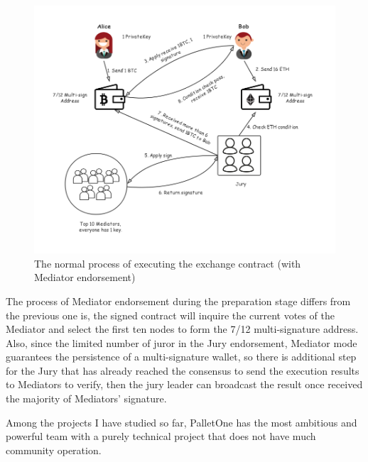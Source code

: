 \begin{figure}[H]
    \includegraphics[width=1\textwidth]{./figures/mediator.png}
    \centering
    \caption{The normal process of executing the exchange contract (with Mediator endorsement) }
    \label{fig:mediator}
    \centering
\end{figure}
\noindent The process of Mediator endorsement during the preparation stage differs from the previous one is, the signed contract will inquire the current votes of the Mediator and select the first ten nodes to form the 7/12 multi-signature address. Also, since the limited number of juror in the Jury endorsement, Mediator mode guarantees the persistence of a multi-signature wallet, so there is additional step for the Jury that has already reached the consensus to send the execution results to Mediators to verify, then the jury leader can broadcast the result once received the majority of Mediators' signature.

\noindent Among the projects I have studied so far, PalletOne has the most ambitious and powerful team with a purely technical project that does not have much community operation.